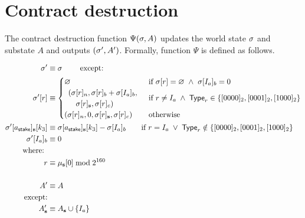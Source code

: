 

\section{Contract destruction}\label{sec:contract_destruct}

The contract destruction function $\Psi(\mathbf{\sigma},A)$ updates the world state $\mathbf{\sigma}$ and substate $A$ and outputs $(\mathbf{\sigma}',A')$. Formally, function $\Psi$ is defined as follows.

\begin{align}
	\st'  &\eqdef \st \qquad \mbox{ except:}\\
	\st'[r] &\equiv \begin{cases}
		\varnothing &\text{if}\ \st[r] = \varnothing\ \wedge\ \st[I_{a}]_{b} = 0\\
		\begin{array}{l}
			(\st[r]_{n}, \st[r]_{b} + \st[I_{a}]_{b}, \\
			\quad\st[r]_{\mathbf{s}}, \st[r]_{c})
		\end{array} & \text{if}\ r \neq I_{a} \; \land \; \mathsf{Type}_r\in \{[0000]_2,[0001]_2,[1000]_2\}\\
		(\st[r]_{n}, 0, \st[r]_{\mathbf{s}}, \st[r]_{c}) & \text{otherwise}
	\end{cases}\\
	\st'[a_{\sf stake}]_{\bf s}[k_3] &\eqdef \st[a_{\sf stake}]_{\bf s}[k_3] - \st[I_a]_{b} \qquad \text{if}\ r = I_{a} \; \lor \; \mathsf{Type}_r\notin \{[0000]_2,[0001]_2,[1000]_2\}   \\
	\st'[I_{a}]_{b} &\eqdef 0 \\
		\mbox{where: } &\\ 
		 r &\eqdef \mst_{\mathbf{s}}[0] \bmod 2^{160} \\
	\notag \\
	A' & \eqdef A \\
	\mbox{except:} & \\ 
	A'_{\mathbf{s}} &\eqdef A_{\mathbf{s}} \cup \{I_a\}
\end{align}
